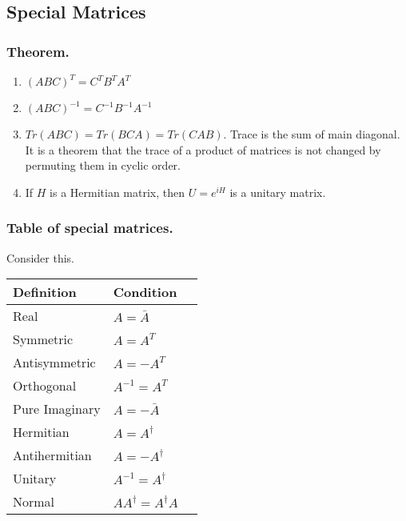 \documentclass[../main.tex]{subfiles}
\begin{document}
\subsection*{Special Matrices}
\subsubsection*{Theorem.}
\begin{enumerate}
    \item $(ABC)^T=C^TB^TA^T$
    \item $(ABC)^{-1}=C^{-1}B^{-1}A^{-1}$
    \item $Tr(ABC)=Tr(BCA)=Tr(CAB)$.  Trace is the sum of main diagonal. It is a theorem that the
    trace of a product of matrices is not changed by permuting them in cyclic order.
    \item If $H$ is a Hermitian matrix, then $U = e^{iH}$ is a unitary matrix.
\end{enumerate}

\subsubsection*{Table of special matrices.} Consider this.

\begin{table}[h]
    \centering
    \begin{tabular}{@{}llr@{}} 
        \toprule
        Definition & Condition  \\ 
        \midrule
        Real & $A=\bar{A}$  \\  
        Symmetric & $A=A^T$ \\     
        Antisymmetric & $A=-A^T$ \\
        Orthogonal & $A^{-1}=A^T$ \\
        Pure Imaginary & $A=-\bar{A}$ \\
        Hermitian & $A=A^{\dagger}$ \\
        Antihermitian & $A=-A^{\dagger}$\\
        Unitary & $A^{-1}=A^{\dagger}$\\
        Normal & $AA^{\dagger}=A^{\dagger}A$\\
        \bottomrule
    \end{tabular}
\end{table}
\end{document}
